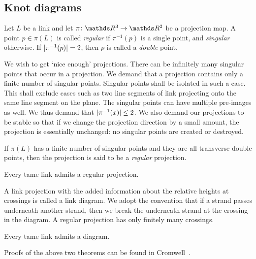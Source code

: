 \subsection{Knot diagrams}

Let \(L\) be a link and let \(\pi \colon \rthree \rightarrow \rtwo\) be a projection map. A point \(p \in \pi(L)\) is called \textit{regular} if \(\pi^{-1}(p)\) is a single point, and \textit{singular} otherwise. If \(\lvert\pi^{-1}(p)\rvert = 2\), then \(p\) is called a \textit{double} point.

We wish to get `nice enough' projections. There can be infinitely many singular points that occur in a projection. We demand that a projection contains only a finite number of singular points. Singular points shall be isolated in such a case. This shall exclude cases such as two line segments of link projecting onto the same line segment on the plane. The singular points can have multiple pre-images as well. We thus demand that \(\lvert\pi^{-1} (x)\rvert \leq 2\). We also demand our projections to be stable so that if we change the projection direction by a small amount, the projection is essentially unchanged: no singular points are created or destroyed.

\begin{defn}
    If \(\pi(L)\) has a finite number of singular points and they are all transverse double points, then the projection is said to be a \textit{regular} projection.
\end{defn}

\begin{thm}
    Every tame link admits a regular projection.
\end{thm}

A link projection with the added information about the relative heights at crossings is called a link diagram. We adopt the convention that if a strand passes underneath another strand, then we break the underneath strand at the crossing in the diagram. A regular projection has only finitely many crossings.

\begin{thm}
    Every tame link admits a diagram.
\end{thm}

Proofs of the above two theorems can be found in Cromwell~\cite[chp.~3]{cromwell}.
